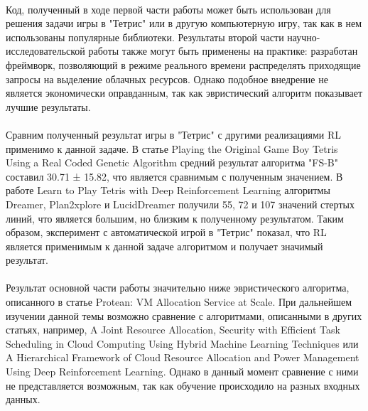 \documentclass{article}
\begin{document}
~\\
Код, полученный в ходе первой части работы может быть использован для решения задачи игры в "Тетрис" или в другую компьютерную игру, так как в нем использованы популярные библиотеки. Результаты второй части научно-исследовательской работы также могут быть применены на практике: разработан фреймворк, позволяющий в режиме реального времени распределять приходящие запросы на выделение облачных ресурсов. Однако подобное внедрение не является экономически оправданным, так как эвристический алгоритм показывает лучшие результаты.\\
~\\
Сравним полученный результат игры в "Тетрис" с другими реализациями RL применимо к данной задаче. В статье Playing the Original Game Boy Tetris Using a Real Coded Genetic Algorithm\cite{litlink7} средний результат алгоритма "FS-B" составил 30.71 ± 15.82, что является сравнимым с полученным значением. В работе Learn to Play Tetris with Deep Reinforcement Learning\cite{litlink20} алгоритмы Dreamer, Plan2xplore и LucidDreamer получили 55, 72 и 107 значений стертых линий, что является большим, но близким к полученному результатом. Таким образом, эксперимент с автоматической игрой в "Тетрис" показал, что RL является применимым к данной задаче алгоритмом и получает значимый результат.\\
~\\
Результат основной части работы значительно ниже эвристического алгоритма, описанного в статье Protean: VM Allocation Service at Scale\cite{litlink21}. При дальнейшем изучении данной темы возможно сравнение с алгоритмами, описанными в других статьях, например, A Joint Resource Allocation, Security with Efficient Task Scheduling in Cloud Computing Using Hybrid Machine Learning Techniques\cite{litlink23} или A Hierarchical Framework of Cloud Resource Allocation and Power Management Using Deep Reinforcement Learning\cite{litlink24}. Однако в данный момент сравнение с ними не представляется возможным, так как обучение происходило на разных входных данных.
\newpage
\end{document}
